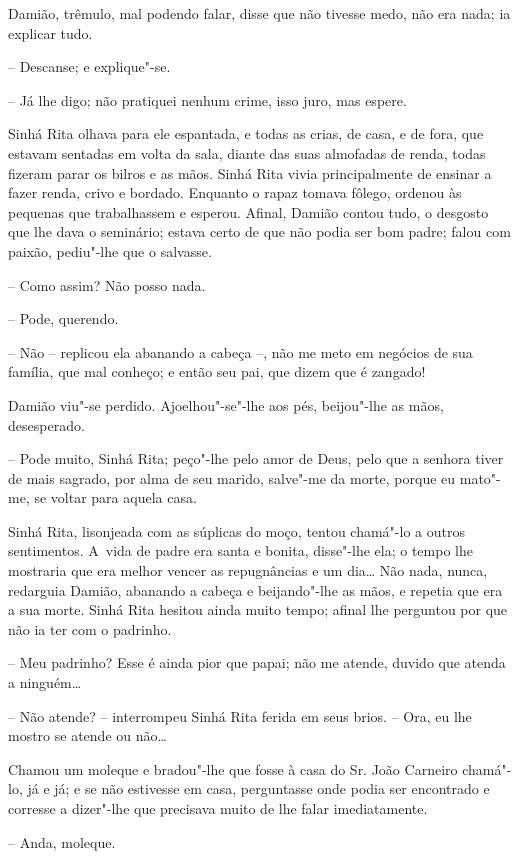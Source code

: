 Damião, trêmulo, mal podendo falar, disse que não tivesse medo, não era
nada; ia explicar tudo.

-- Descanse; e explique"-se.

-- Já lhe digo; não pratiquei nenhum crime, isso juro, mas espere.

Sinhá Rita olhava para ele espantada, e todas as crias, de casa, e de
fora, que estavam sentadas em volta da sala, diante das suas almofadas
de renda, todas fizeram parar os bilros e as mãos. Sinhá Rita vivia
principalmente de ensinar a fazer renda, crivo e bordado. Enquanto o
rapaz tomava fôlego, ordenou às pequenas que trabalhassem e esperou.
Afinal, Damião contou tudo, o desgosto que lhe dava o seminário; estava
certo de que não podia ser bom padre; falou com paixão, pediu"-lhe que o
salvasse.

-- Como assim? Não posso nada.

-- Pode, querendo.

-- Não -- replicou ela abanando a cabeça --, não me meto em negócios de
sua família, que mal conheço; e então seu pai, que dizem que é zangado!

Damião viu"-se perdido. Ajoelhou"-se"-lhe aos pés, beijou"-lhe as mãos,
desesperado.

-- Pode muito, Sinhá Rita; peço"-lhe pelo amor de Deus, pelo que a
senhora tiver de mais sagrado, por alma de seu marido, salve"-me da
morte, porque eu mato"-me, se voltar para aquela casa.

Sinhá Rita, lisonjeada com as súplicas do moço, tentou chamá"-lo a outros
sentimentos. A~vida de padre era santa e bonita, disse"-lhe ela; o tempo
lhe mostraria que era melhor vencer as repugnâncias e um dia\ldots{} Não
nada, nunca, redarguia Damião, abanando a cabeça e beijando"-lhe as mãos,
e repetia que era a sua morte. Sinhá Rita hesitou ainda muito tempo;
afinal lhe perguntou por que não ia ter com o padrinho.

-- Meu padrinho? Esse é ainda pior que papai; não me atende, duvido que
atenda a ninguém\ldots{}

-- Não atende? -- interrompeu Sinhá Rita ferida em seus brios. -- Ora,
eu lhe mostro se atende ou não\ldots{}

Chamou um moleque e bradou"-lhe que fosse à casa do Sr. João Carneiro
chamá"-lo, já e já; e se não estivesse em casa, perguntasse onde podia
ser encontrado e corresse a dizer"-lhe que precisava muito de lhe falar
imediatamente.

-- Anda, moleque.


